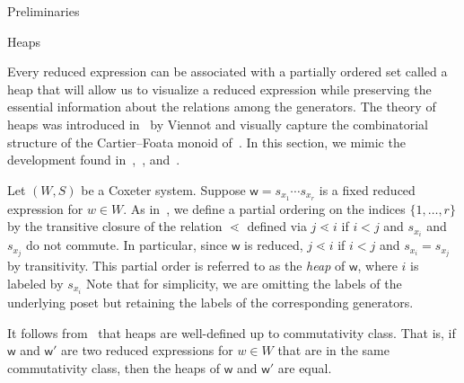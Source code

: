 \documentclass[11pt]{amsart}
\theoremstyle{definition}
\numberwithin{equation}{section}
\newcommand{\C}{\widetilde{C}}
\renewcommand{\(}{\left(}
\renewcommand{\)}{\right)}
\newcommand{\w}{\mathsf{w}}
\begin{document}
\begin{section}{Preliminaries}



\begin{subsection}{Heaps}\label{subsec:heaps}

Every reduced expression can be associated with a partially ordered set called a heap that will allow us to visualize a reduced expression  while preserving the essential information about the relations among the generators.  The theory of heaps was introduced in~\cite{Viennot1986} by Viennot and visually capture the combinatorial structure of the Cartier--Foata monoid of~\cite{Cartier1969}.  
In this section, we mimic the development found in~\cite{Billey2007},~\cite{Ernst2010}, and~\cite{Stembridge1996}.

Let $(W,S)$ be a Coxeter system.  Suppose $\w = s_{x_1} \cdots s_{x_r}$ is a fixed reduced expression for $w \in W$.  As in~\cite{Stembridge1996}, we define a partial ordering on the indices $\{1, \dots, r\}$ by the transitive closure of the relation $\lessdot$ defined via $j \lessdot i$ if $i < j$ and $s_{x_i}$ and $s_{x_j}$ do not commute.  In particular, since $\w$ is reduced, $j \lessdot i$ if $i < j$ and $s_{x_i} = s_{x_j}$ by transitivity.  This partial order is referred to as the \emph{heap} of $\w$, where $i$ is labeled by $s_{x_i}$  Note that for simplicity, we are omitting the labels of the underlying poset but retaining the labels of the corresponding generators.

It follows from~\cite[Proposition 2.2]{Stembridge1996} that heaps are well-defined up to commutativity class.  That is, if $\w$ and $\w'$ are two reduced expressions for $w \in W$ that are in the same commutativity class, then the heaps of $\w$ and $\w'$ are equal.  


\end{subsection}
\end{section}
\end{document}

